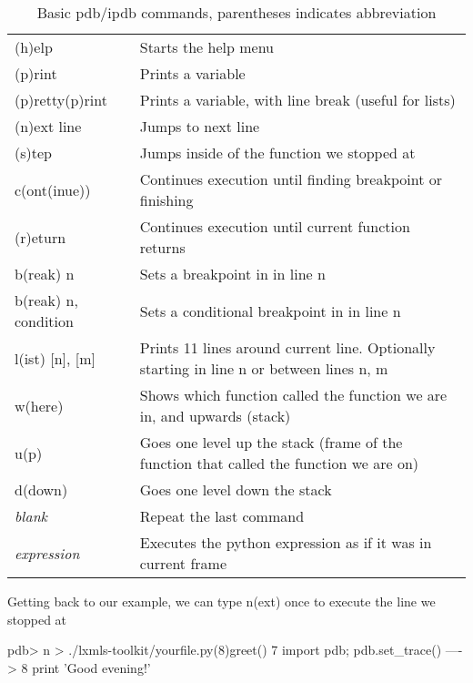 \begin{table}[!h]
\begin{center}
\begin{tabular}{|l|l|}
\hline
(h)elp           & Starts the help menu\\
(p)rint          & Prints a variable\\
(p)retty(p)rint	 & Prints a variable, with line break (useful for lists)\\
\hline
(n)ext line      & Jumps to next line\\ 
(s)tep           & Jumps inside of the function we stopped at\\
c(ont(inue))     & Continues execution until finding breakpoint or finishing\\
(r)eturn         & Continues execution until current function returns\\
b(reak) n        & Sets a breakpoint in in line n\\
b(reak) n, condition  & Sets a conditional breakpoint in in line n\\
\hline
l(ist) [n], [m]  & Prints 11 lines around current line. Optionally starting in line n or between lines n, m\\
w(here)          & Shows which function called the function we are in, and upwards (stack)\\
u(p)             & Goes one level up the stack (frame of the function that called the function we are on)\\
d(down)          & Goes one level down the stack\\
\hline
\textit{blank}          & Repeat the last command\\ 
\textit{expression}     & Executes the python expression as if it was in current frame\\
\hline
\end{tabular}
\end{center}
\caption{\label{tb::pdbbasiccommands}Basic pdb/ipdb commands, parentheses indicates abbreviation}
\end{table}

\noindent Getting back to our example, we can type n(ext) once to execute the line we
stopped at

\begin{python}
pdb> n
> ./lxmls-toolkit/yourfile.py(8)greet()
      7                 import pdb; pdb.set_trace()
----> 8                 print 'Good evening!' 
\end{python}

